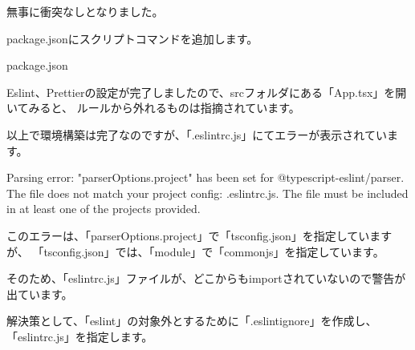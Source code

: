 無事に衝突なしとなりました。

package.jsonにスクリプトコマンドを追加します。

\def\startercodeblockfontsize{}
\begin{starterprogram}[]{package.json}\end{starterprogram}

Eslint、Prettierの設定が完了しましたので、srcフォルダにある「App.tsx」を開いてみると、
ルールから外れるものは指摘されています。

\vspace*{\baselineskip}

以上で環境構築は完了なのですが、「.eslintrc.js」にてエラーが表示されています。

\begin{starterquote}

Parsing error: "parserOptions.project" has been set for @typescript{-}eslint/parser.
The file does not match your project config: .eslintrc.js.
The file must be included in at least one of the projects provided.

\end{starterquote}

このエラーは、「parserOptions.project」で「tsconfig.json」を指定していますが、
「tsconfig.json」では、「module」で「commonjs」を指定しています。

\vspace*{\baselineskip}

そのため、「eslintrc.js」ファイルが、どこからもimportされていないので警告が出ています。

\vspace*{\baselineskip}

解決策として、「eslint」の対象外とするために「.eslintignore」を作成し、「eslintrc.js」を指定します。

